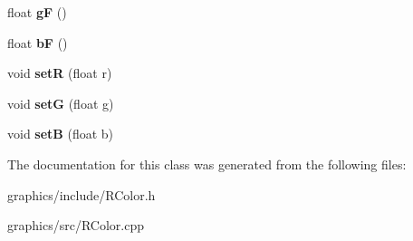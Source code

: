 \begin{DoxyCompactItemize}
\item 
\hypertarget{classRColor_af820dc92dbc8982dfba4419a5e5c6346}{
float {\bfseries gF} ()}
\label{classRColor_af820dc92dbc8982dfba4419a5e5c6346}

\item 
\hypertarget{classRColor_a31b431b26b651eaef114f31f29a87e79}{
float {\bfseries bF} ()}
\label{classRColor_a31b431b26b651eaef114f31f29a87e79}

\item 
\hypertarget{classRColor_a620c88b0ecfc6aeb6e3be308c53a223d}{
void {\bfseries setR} (float r)}
\label{classRColor_a620c88b0ecfc6aeb6e3be308c53a223d}

\item 
\hypertarget{classRColor_aaa40dfb82786e861b8695daf67426638}{
void {\bfseries setG} (float g)}
\label{classRColor_aaa40dfb82786e861b8695daf67426638}

\item 
\hypertarget{classRColor_aa1d520093061ef8780ca45ead346fb11}{
void {\bfseries setB} (float b)}
\label{classRColor_aa1d520093061ef8780ca45ead346fb11}

\end{DoxyCompactItemize}


The documentation for this class was generated from the following files:\begin{DoxyCompactItemize}
\item 
graphics/include/RColor.h\item 
graphics/src/RColor.cpp\end{DoxyCompactItemize}
